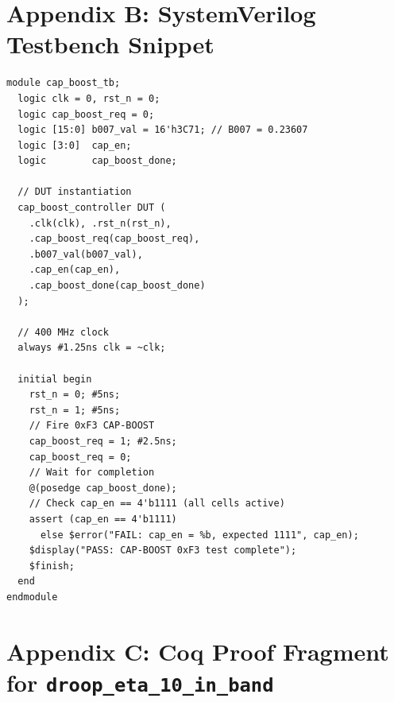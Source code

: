 \documentclass[12pt,a4paper]{report}
\theoremstyle{plain}
\theoremstyle{definition}
\theoremstyle{remark}
\begin{document}
\section*{Appendix B: SystemVerilog Testbench Snippet}
\label{sec:appendix-tb}

\begin{lstlisting}[style=verilog,caption={Testbench for \texttt{cap\_boost\_controller.sv}}]
module cap_boost_tb;
  logic clk = 0, rst_n = 0;
  logic cap_boost_req = 0;
  logic [15:0] b007_val = 16'h3C71; // B007 = 0.23607
  logic [3:0]  cap_en;
  logic        cap_boost_done;

  // DUT instantiation
  cap_boost_controller DUT (
    .clk(clk), .rst_n(rst_n),
    .cap_boost_req(cap_boost_req),
    .b007_val(b007_val),
    .cap_en(cap_en),
    .cap_boost_done(cap_boost_done)
  );

  // 400 MHz clock
  always #1.25ns clk = ~clk;

  initial begin
    rst_n = 0; #5ns;
    rst_n = 1; #5ns;
    // Fire 0xF3 CAP-BOOST
    cap_boost_req = 1; #2.5ns;
    cap_boost_req = 0;
    // Wait for completion
    @(posedge cap_boost_done);
    // Check cap_en == 4'b1111 (all cells active)
    assert (cap_en == 4'b1111)
      else $error("FAIL: cap_en = %b, expected 1111", cap_en);
    $display("PASS: CAP-BOOST 0xF3 test complete");
    $finish;
  end
endmodule
\end{lstlisting}

\section*{Appendix C: Coq Proof Fragment for \texttt{droop\_eta\_10\_in\_band}}
\label{sec:appendix-coq}
\end{document}
